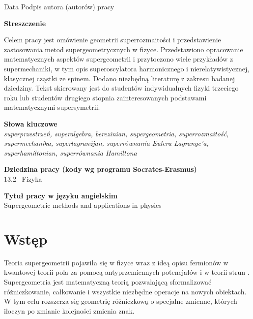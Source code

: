 \documentclass[11pt,a4paper]{report}
\theoremstyle{definition}
\begin{document}
\noindent \hspace{1cm} \textnormal{Data} \hspace{2cm} \textnormal{Podpis autora (autorów) pracy}

\newpage

\begin{center}
	\textbf{Streszczenie}
\end{center}
\textnormal{Celem pracy jest omówienie geometrii superrozmaitości i przedstawienie zastosowania metod supergeometrycznych w fizyce. Przedstawiono opracowanie matematycznych aspektów supergeometrii i przytoczono wiele przykładów z supermechaniki, w tym opis superoscylatora harmonicznego i nierelatywistycznej, klasycznej cząstki ze spinem. Dodano niezbędną literaturę z zakresu badanej dziedziny. Tekst skierowany jest do studentów indywidualnych fizyki trzeciego roku lub studentów drugiego stopnia zainteresowanych podstawami matematycznymi supersymetrii.}

\vspace{2cm}

\begin{center}
	\textbf{Słowa kluczowe}\\[0.5cm]
	\textit{superprzestrzeń, superalgebra, berezinian, supergeometria,  superrozmaitość, supermechanika, superlagranżjan, superrównania Eulera-Lagrange'a, superhamiltonian, superrównania Hamiltona}
\end{center}
\vspace{2cm}

\begin{center}
	\textbf{Dziedzina pracy (kody wg programu Socrates-Erasmus)}\\[0.5cm]
	\textnormal{13.2 \ Fizyka}
\end{center}
\vspace{2cm}

\begin{center}
	\textbf{Tytuł pracy w języku angielskim}\\[0.5cm]
	\textnormal{Supergeometric methods and applications in physics}
\end{center}

\newpage
\tableofcontents

\newpage
\chapter*{Wstęp}
Teoria supergeometrii pojawiła się w fizyce wraz z ideą opisu fermionów w kwantowej teorii pola za pomocą antyprzemiennych potencjałów \cite{schmitt} i w teorii strun \cite{GS71,Sc12}. Supergeometria jest matematyczną teorią pozwalającą sformalizować różniczkowanie, całkowanie i wszystkie niezbędne operacje na nowych obiektach. W tym celu rozszerza się geometrię różniczkową o specjalne zmienne, których iloczyn po zmianie kolejności zmienia znak.
\end{document}
